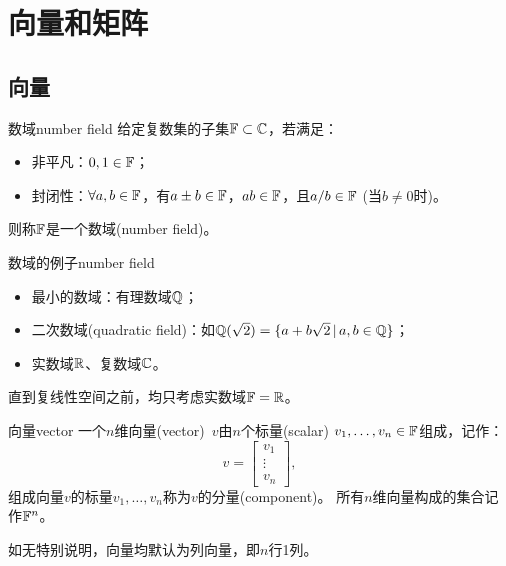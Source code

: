 \chapter{向量和矩阵}

\section{向量}

\begin{definition}
	{数域}{number field}
	给定复数集的子集$\mathbb F\subset\mathbb C$，若满足：
	\begin{itemize}
		\item 非平凡：$0,1\in\mathbb F$；
		\item 封闭性：$\forall a,b\in\mathbb F$，有$a\pm b\in\mathbb F$，$ab\in\mathbb F$，且$a/b\in\mathbb F$ (当$b\neq 0$时)。
	\end{itemize}
	则称$\mathbb F$是一个数域(number field)。
\end{definition}

\begin{example}
	{数域的例子}{number field}
	\begin{itemize}
		\item 最小的数域：有理数域$\mathbb Q$；
	
		\item 二次数域(quadratic field)：如$\mathbb Q(\sqrt 2)=\{a+b\sqrt2\,|\,a,b\in\mathbb Q\}$；
	
		\item 实数域$\mathbb R$、复数域$\mathbb C$。
	\end{itemize}
\end{example}

\begin{remark}
	直到复线性空间之前，均只考虑实数域$\mathbb F=\mathbb R$。
\end{remark}

\begin{definition}{向量}{vector}
	一个$n$维向量(vector)~$v$由$n$个标量(scalar) $v_1,\ldots,v_n\in\mathbb F$组成，记作：
	\[
		v=\begin{bmatrix}
			v_1\\\vdots\\v_n
		\end{bmatrix},
	\]
	组成向量$v$的标量$v_1,\ldots,v_n$称为$v$的分量(component)。
	\tcblower
	所有$n$维向量构成的集合记作$\mathbb F^n$。
\end{definition}

\begin{remark}
	如无特别说明，向量均默认为列向量，即$n$行1列。
\end{remark}

